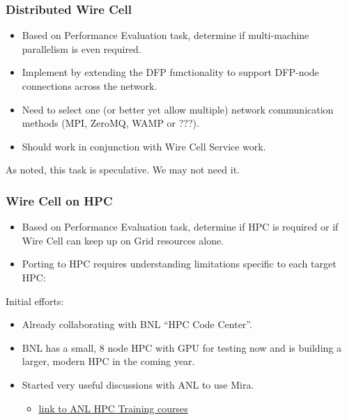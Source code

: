 \documentclass[xcolor=dvipsnames]{beamer}
\begin{document}
\begin{frame}
  \frametitle{Distributed Wire Cell}

  \begin{itemize}
  \item Based on Performance Evaluation task, determine if
    multi-machine parallelism is even required.
  \item Implement by extending the DFP functionality to support
    DFP-node connections across the network.
  \item Need to select one (or better yet allow multiple) network
    communication methods (MPI, ZeroMQ, WAMP or ???).
  \item Should work in conjunction with Wire Cell Service work.
  \end{itemize}

  As noted, this task is speculative.  We may not need it.

\end{frame}

\begin{frame}
  \frametitle{Wire Cell on HPC}
  \small
  \begin{itemize}
  \item Based on Performance Evaluation task, determine if HPC is
    required or if Wire Cell can keep up on Grid resources alone.
  \item Porting to HPC requires understanding limitations specific
    to each target HPC:
  \end{itemize}

  \vspace{-3mm}
  Initial efforts:
  \begin{itemize}\footnotesize
  \item Already collaborating with BNL ``HPC Code Center''.
  \item BNL has a small, 8 node HPC with GPU for testing now and is
    building a larger, modern HPC in the coming year.
  \item Started very useful discussions with ANL to use Mira.
    \begin{itemize}\scriptsize
    \item
      \href{http://www.alcf.anl.gov/events/getting-started-alcf-resources}{link
        to ANL HPC Training courses}
    \end{itemize}
  \end{itemize}

\end{frame}
\end{document}
